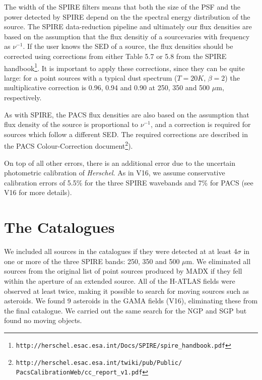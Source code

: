 \documentclass[useAMS,usenatbib]{mnras}
\begin{document}
The width of the SPIRE filters means that both the size of the PSF and
the power detected by SPIRE depend on the the spectral energy
distribution of the source.  The SPIRE data-reduction pipeline and
ultimately our flux densities are based on the assumption that the
flux densitiy of a sourcevaries with frequency as $\nu^{-1}$.  If the
user knows the SED of a source, the flux densities should be corrected
using corrections from either Table 5.7 or 5.8 from the SPIRE
handbook\footnote{\tt{http://herschel.esac.esa.int/Docs/SPIRE/spire\_handbook.pdf}}.
It is important to apply these corrections, since they can be quite
large: for a point sources with a typical dust spectrum ($T=20K$,
$\beta=2$) the multiplicative correction is 0.96, 0.94 and 0.90 at
250, 350 and 500 $\mu$m, respectively.

As with SPIRE, the PACS flux densities are also based on the
assumption that flux density of the source is proportional to $\nu^{-1}$, and
a correction is required for sources which follow a different SED. The
required corrections are described in the PACS Colour-Correction
document\footnote{\tt{http://herschel.esac.esa.int/twiki/pub/Public/
  PacsCalibrationWeb/cc\_report\_v1.pdf}}).

On top of all other errors, there is an additional error due to the
uncertain photometric calibration of {\it Herschel}. As in V16, we assume
conservative calibration errors of 5.5\% for the three SPIRE wavebands
and 7\% for PACS (see V16 for more details).

\section{The Catalogues}

We included all sources in the catalogues if they were detected at at
least 4$\sigma$ in one or more of the three SPIRE bands: 250, 350 and
500 $\mu$m.  We eliminated all sources from the original list of point
sources produced by MADX if they fell within the aperture of an
extended source. All of the H-ATLAS fields were observed at least
twice, making it possible to search for moving sources such as
asteroids. We found 9 asteroids in the GAMA fields (V16), eliminating
these from the final catalogue. We carried out the same search for the
NGP and SGP but found no moving objects.
\end{document}
